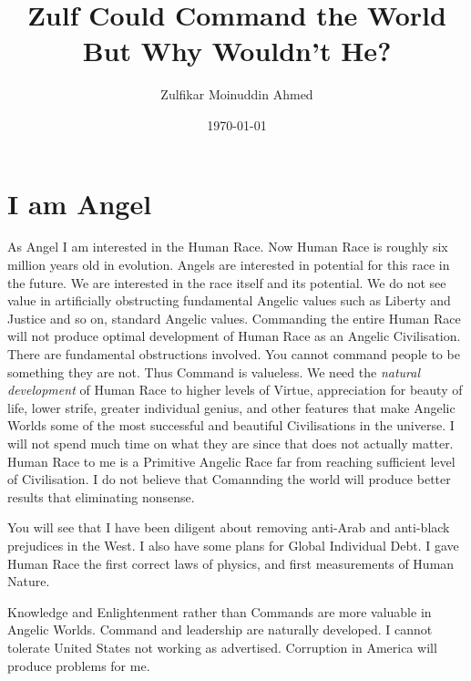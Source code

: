 \documentclass{amsart}
\title{Zulf Could Command the World But Why Wouldn't He?}
\author{Zulfikar Moinuddin Ahmed}
\date{\today}
\begin{document}
\maketitle

\section{I am Angel}

As Angel I am interested in the Human Race.  Now Human Race is roughly six million years old in evolution.  Angels are interested in potential for this race in the future.  We are interested in the race itself and its potential.  We do not see value in artificially obstructing fundamental Angelic values such as Liberty and Justice and so on, standard Angelic values.  Commanding the entire Human Race will not produce optimal development of Human Race as an Angelic Civilisation. There are fundamental obstructions involved.  You cannot command people to be something they are not.  Thus Command is valueless.  We need the {\em natural development} of Human Race to higher levels of Virtue, appreciation for beauty of life, lower strife, greater individual genius, and other features that make Angelic Worlds some of the most successful and beautiful Civilisations in the universe.  I will not spend much time on what they are since that does not actually matter.  Human Race to me is a Primitive Angelic Race far from reaching sufficient level of Civilisation.  I do not believe that Comannding the world will produce better results that eliminating nonsense.  

You will see that I have been diligent about removing anti-Arab and anti-black prejudices in the West.  I also have some plans for Global Individual Debt.  I gave Human Race the first correct laws of physics, and first measurements of Human Nature.  

Knowledge and Enlightenment rather than Commands are more valuable in Angelic Worlds.  Command and leadership are naturally developed.  I cannot tolerate United States not working as advertised.  Corruption in America will produce problems for me.
\end{document}
